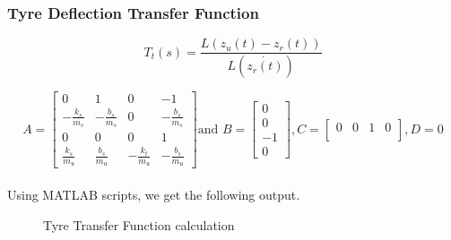 \documentclass[12pt, a4paper, oneside]{report}
\begin{document}
\subsubsection{Tyre Deflection Transfer Function}

\begin{equation}
    T_t(s) = \frac{L(z_u(t) - z_r(t))}{L(\dot{z_r(t)})}
\end{equation}

\begin{equation}
    A = \begin{bmatrix}
        0 & 1 & 0 & -1 \\
        -\frac{k_s}{m_s} & -\frac{b_s}{m_s} & 0 & -\frac{b_s}{m_s} \\
        0 & 0 & 0 & 1 \\
        \frac{k_s}{m_u} & \frac{b_s}{m_u} & -\frac{k_t}{m_u} & -\frac{b_s}{m_u}
    \end{bmatrix} \text{and } B = \begin{bmatrix}
        0 \\
        0 \\
        -1 \\
        0
    \end{bmatrix} 
    ,C = \begin{bmatrix}
        0 & 0 & 1 & 0 \\
    \end{bmatrix}
    ,D = 0
    \nonumber
\end{equation}
\\
Using MATLAB scripts, we get the following output.

\begin{figure}[H]
\centering

\hfill
{}\par 
\caption{Tyre Transfer Function calculation}
\label{fig: open_loop3}
\end{figure}
\end{document}

